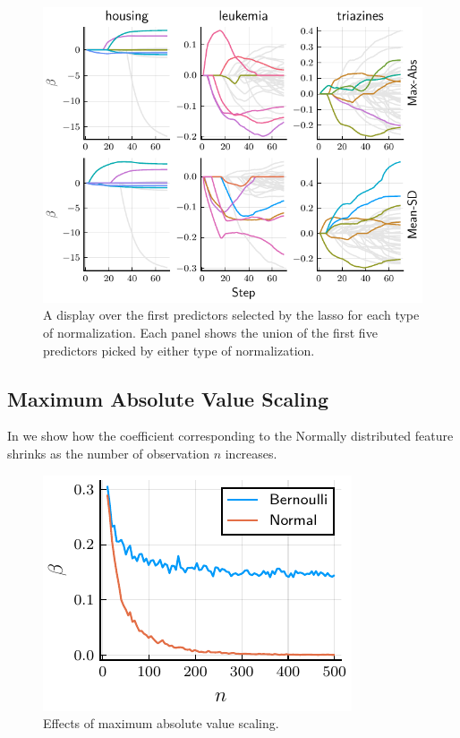 \begin{figure}[htpb]
  \centering
  \includegraphics[]{plots/realdata_paths.pdf}
  \caption{%
    A display over the first predictors selected by the lasso for each type of normalization. Each panel shows the union of the first five predictors picked by either type of normalization.
  }
  \label{fig:realdata-paths}
\end{figure}

\subsection{Maximum Absolute Value Scaling}

In  we show how the coefficient corresponding to the Normally distributed feature shrinks as the number of observation \(n\) increases.

\begin{figure}[htpb]
  \centering
  \includegraphics[]{plots/maxabs_n.pdf}
  \caption{%
    Effects of maximum absolute value scaling.
  }
  \label{fig:maxabs-n}
\end{figure}

\printbibliography


